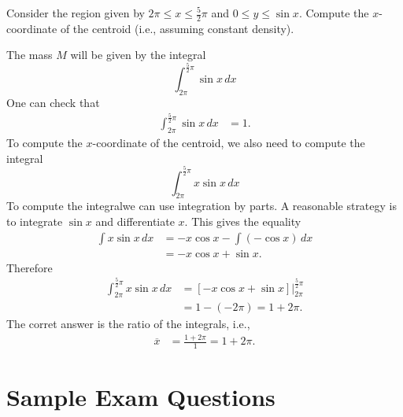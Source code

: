 \documentclass{ximera}
\begin{document}
\begin{question}%

Consider the region given by \(2 \pi \leq x \leq \frac{5}{2} \pi\) and \(0 \leq y \leq \sin {x}\).
Compute the \(x\)-coordinate of the centroid (i.e., assuming constant density).
\begin{multiplechoice}
\choice{\(\displaystyle 3 \pi\)}
\choice{\(\displaystyle 4 \pi\)}
\end{multiplechoice}
\begin{feedback}
The mass  \(M\) will be given by the integral
\[ \int_{2 \pi}^{\frac{5}{2} \pi} \sin {x}\, dx \]
 One can check that
\[ \begin{aligned} \int_{2 \pi}^{\frac{5}{2} \pi} \sin {x}\, dx & = 1. \end{aligned} \]
To compute the  \(x\)-coordinate of the centroid, we also need to compute the integral 
\[ \int_{2 \pi}^{\frac{5}{2} \pi} x \sin {x}\, dx \]
 To compute the integralwe can use integration by parts. A reasonable strategy is to integrate  \(\sin {x}\) and differentiate  \(x\).
 This gives the equality
\[ \begin{aligned} \int x \sin {x}\, dx & = - x \cos {x} - \int \left(- \cos {x}\right)\, dx \\
 & = - x \cos {x} + \sin {x}. \end{aligned} \]
Therefore 
\[ \begin{aligned} \int_{2 \pi}^{\frac{5}{2} \pi} x \sin {x}\, dx & = \left. \left[- x \cos {x} + \sin {x} \right] \right|_{2 \pi}^{\frac{5}{2} \pi}\\ & = 1 - \left(- 2 \pi \right) = 1 + 2 \pi. \end{aligned} \]
The corret answer is the ratio of the integrals, i.e.,
\[ \begin{aligned} \overline{x} & = \frac{1 + 2 \pi}{1} = 1 + 2 \pi. \end{aligned} \]
\end{feedback}

\end{question}

\section*{Sample Exam Questions}
\end{document}
